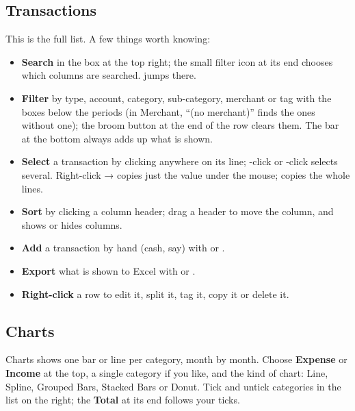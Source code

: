 \documentclass[11pt]{article}
\begin{document}
\subsection{Transactions}

This is the full list. A few things worth knowing:
\begin{itemize}
  \item \textbf{Search} in the box at the top right; the small filter icon at its end chooses which
        columns are searched.  jumps there.
  \item \textbf{Filter} by type, account, category, sub-category, merchant or tag with the boxes
        below the periods (in Merchant, ``(no merchant)'' finds the ones without one); the broom
        button at the end of the row clears them. The bar at the bottom always adds up what is shown.
  \item \textbf{Select} a transaction by clicking anywhere on its line; -click or
        -click selects several. Right-click →  copies just the value
        under the mouse;  copies the whole lines.
  \item \textbf{Sort} by clicking a column header; drag a header to move the column, and
         shows or hides columns.
  \item \textbf{Add} a transaction by hand (cash, say) with  or .
  \item \textbf{Export} what is shown to Excel with  or .
  \item \textbf{Right-click} a row to edit it, split it, tag it, copy it or delete it.
\end{itemize}

\subsection{Charts}

Charts shows one bar or line per category, month by month. Choose \textbf{Expense} or \textbf{Income}
at the top, a single category if you like, and the kind of chart: Line, Spline, Grouped Bars,
Stacked Bars or Donut. Tick and untick categories in the list on the right; the \textbf{Total} at its
end follows your ticks.
\end{document}
